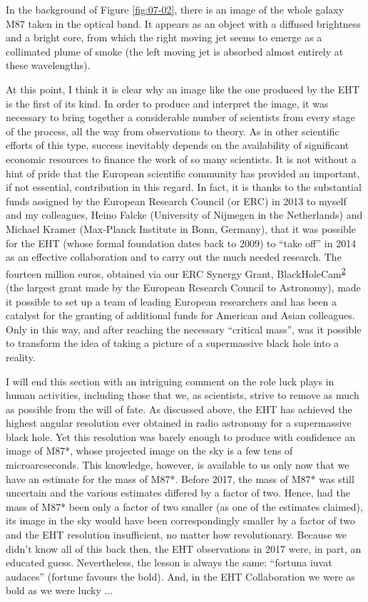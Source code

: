 In the background of Figure \ref{fig:07-02}, there is an image of the whole galaxy M87 taken in the
optical band. It appears as an object with a diffused brightness and a bright core, from
which the right moving jet seems to emerge as a collimated plume of smoke (the left
moving jet is absorbed almost entirely at these wavelengths).

At this point, I think it is clear why an image like the one produced by the EHT is the
first of its kind. In order to produce and interpret the image, it was necessary to
bring together a considerable number of scientists from every stage of the process, all
the way from observations to theory. As in other scientific efforts of this type,
success inevitably depends on the availability of significant economic resources to
finance the work of so many scientists. It is not without a hint of pride that the
European scientific community has provided an important, if not essential, contribution
in this regard. In fact, it is thanks to the substantial funds assigned by the European
Research Council (or ERC) in 2013 to myself and my colleagues, Heino
Falcke (University of Nijmegen in the Netherlands) and Michael Kramer (Max-Planck
Institute in Bonn, Germany), that it was possible for the EHT (whose formal foundation
dates back to 2009) to ``take off'' in 2014 as an effective collaboration and to carry
out the much needed research. The fourteen million euros, obtained via our ERC Synergy
Grant, BlackHoleCam\textsuperscript{\hyperlink{note:07-02}{2}} (the largest grant made by the
European Research Council to Astronomy), made it possible to set up a team of leading
European researchers and has been a catalyst for the granting of additional funds for
American and Asian colleagues. Only in this way, and after reaching the necessary
``critical mass'', was it possible to transform the idea of taking a picture of a
supermassive black hole into a reality.

I will end this section with an intriguing comment on the role luck plays in human
activities, including those that we, as scientists, strive to remove as much as possible
from the will of fate. As discussed above, the EHT has achieved the highest angular
resolution ever obtained in radio astronomy for a supermassive black
hole. Yet this resolution was barely enough to produce with confidence an image of
M87*, whose projected image on the sky is a few tens of
microarcseconds. This knowledge, however, is available to us only now that we have an
estimate for the mass of M87*. Before 2017, the mass of M87* was still uncertain and the
various estimates differed by a factor of two. Hence, had the mass of M87* been only a
factor of two smaller (as one of the estimates claimed), its image in the sky would have
been correspondingly smaller by a factor of two and the EHT resolution insufficient, no
matter how revolutionary. Because we didn't know all of this back then, the EHT
observations in 2017 were, in part, an educated guess. Nevertheless, the lesson is
always the same: ``fortuna iuvat audaces'' (fortune favours the bold). And, in the EHT
Collaboration we were as bold as we were lucky ...


